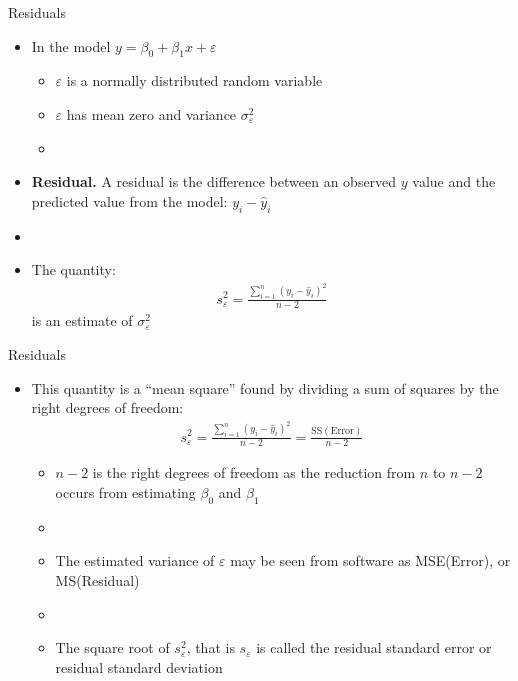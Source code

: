 \documentclass[xcolor=dvipsnames]{beamer}
\begin{document}
\begin{frame}{Residuals}
\begin{itemize}
	\item In the model $y = \beta_0 + \beta_1 x + \varepsilon$
	\begin{itemize}
		\item $\varepsilon$ is a normally distributed random variable
		\item $\varepsilon$ has mean zero and variance $\sigma^2_{\varepsilon}$
		\item[]
	\end{itemize} 
	\item \textbf{Residual.} A residual is the difference between an observed $y$ value and the predicted value from the model: $y_i - \hat{y}_i$ \pause
	\item[]
	\item The quantity: \pause
	\begin{gather*}
		s^2_{\varepsilon} = \frac{\sum_{i=1}^{n}\left(y_i - \hat{y}_i\right)^2}{n-2}
	\end{gather*} 
	is an estimate of $\sigma^2_{\varepsilon}$
\end{itemize}
\end{frame}

\begin{frame}{Residuals}
	\begin{itemize}
		\item This quantity is a ``mean square'' found by dividing a sum of squares by the right degrees of freedom: \pause
		\begin{gather*}
		s^2_{\varepsilon} = \frac{\sum_{i=1}^{n}\left(y_i - \hat{y}_i\right)^2}{n-2} = \frac{\text{SS}(\text{Error})}{n-2}
		\end{gather*} \pause
		\begin{itemize}
			\item $n-2$ is the right degrees of freedom as the reduction from $n$ to $n-2$ occurs from estimating $\beta_0$ and $\beta_1$ \pause
			\item[]
			\item The estimated variance of $\varepsilon$ may be seen from software as MSE(Error), or MS(Residual) \pause
			\item[]
			\item The square root of $s_{\varepsilon}^2$, that is $s_{\varepsilon}$ is called the residual standard error or residual standard deviation
		\end{itemize}
	\end{itemize}
\end{frame}
\end{document}
